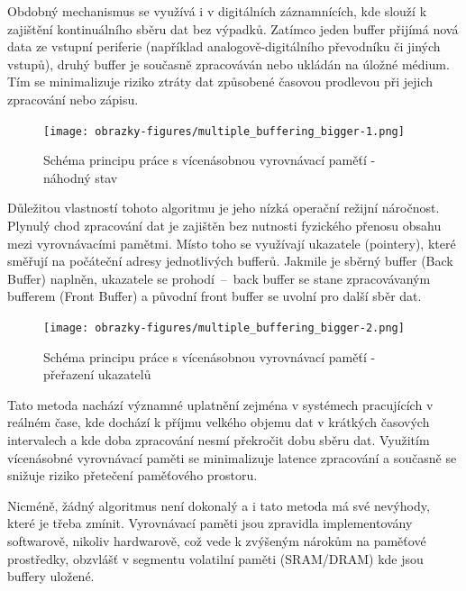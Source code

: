Obdobný mechanismus se využívá i v digitálních záznamnících, kde slouží k zajištění kontinuálního sběru dat bez výpadků. Zatímco jeden buffer přijímá nová data ze vstupní periferie (například analogově-digitálního převodníku či jiných vstupů), druhý buffer je současně zpracováván nebo ukládán na úložné médium. Tím se minimalizuje riziko ztráty dat způsobené časovou prodlevou při jejich zpracování nebo zápisu.

\begin{figure}[h]
    \centering
    \texttt{[image: obrazky-figures/multiple\_buffering\_bigger-1.png]}
    
    \caption{Schéma principu práce s vícenásobnou vyrovnávací paměťí - náhodný stav}
    \label{fig:multiple-buffering-1}
\end{figure}

Důležitou vlastností tohoto algoritmu je jeho nízká operační režijní náročnost. Plynulý chod zpracování dat je zajištěn bez nutnosti fyzického přenosu obsahu mezi vyrovnávacími pamětmi. Místo toho se využívají ukazatele (pointery), které směřují na počáteční adresy jednotlivých bufferů. Jakmile je sběrný buffer (Back Buffer) naplněn, ukazatele se prohodí~–~back buffer se stane zpracovávaným bufferem (Front Buffer) a původní front buffer se uvolní pro další sběr dat.

\begin{figure}[h]
    \centering
    \texttt{[image: obrazky-figures/multiple\_buffering\_bigger-2.png]}
    
    \caption{Schéma principu práce s vícenásobnou vyrovnávací paměťí - přeřazení ukazatelů}
    \label{fig:multiple-buffering-2}
\end{figure}

Tato metoda nachází významné uplatnění zejména v systémech pracujících v reálném čase, kde dochází k příjmu velkého objemu dat v krátkých časových intervalech a kde doba zpracování nesmí překročit dobu sběru dat. Využitím vícenásobné vyrovnávací paměti se minimalizuje latence zpracování a současně se snižuje riziko přetečení paměťového prostoru. \cite{buffering_chang}

Nicméně, žádný algoritmus není dokonalý a i tato metoda má své nevýhody, které je třeba zmínit. Vyrovnávací paměti jsou zpravidla implementovány softwarově, nikoliv hardwarově, což vede k zvýšeným nárokům na paměťové prostředky, obzvlášť v segmentu volatilní paměti (SRAM/DRAM) kde jsou buffery uložené. \cite{basics_of_digital_forensics}

